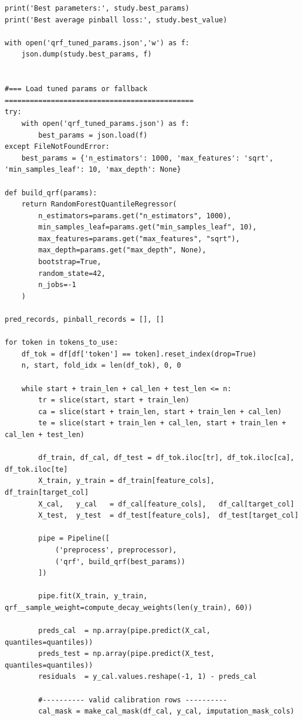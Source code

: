\documentclass[
  a4paper,
  DIV=11,
  numbers=noendperiod]{scrreprt}
\begin{document}
\begin{verbatim}
print('Best parameters:', study.best_params)
print('Best average pinball loss:', study.best_value)

with open('qrf_tuned_params.json','w') as f:
    json.dump(study.best_params, f)


#=== Load tuned params or fallback =============================================
try:
    with open('qrf_tuned_params.json') as f:
        best_params = json.load(f)
except FileNotFoundError:
    best_params = {'n_estimators': 1000, 'max_features': 'sqrt', 'min_samples_leaf': 10, 'max_depth': None}

def build_qrf(params):
    return RandomForestQuantileRegressor(
        n_estimators=params.get("n_estimators", 1000),
        min_samples_leaf=params.get("min_samples_leaf", 10),
        max_features=params.get("max_features", "sqrt"),
        max_depth=params.get("max_depth", None),
        bootstrap=True,
        random_state=42,
        n_jobs=-1
    )

pred_records, pinball_records = [], []

for token in tokens_to_use:
    df_tok = df[df['token'] == token].reset_index(drop=True)
    n, start, fold_idx = len(df_tok), 0, 0

    while start + train_len + cal_len + test_len <= n:
        tr = slice(start, start + train_len)
        ca = slice(start + train_len, start + train_len + cal_len)
        te = slice(start + train_len + cal_len, start + train_len + cal_len + test_len)

        df_train, df_cal, df_test = df_tok.iloc[tr], df_tok.iloc[ca], df_tok.iloc[te]
        X_train, y_train = df_train[feature_cols], df_train[target_col]
        X_cal,   y_cal   = df_cal[feature_cols],   df_cal[target_col]
        X_test,  y_test  = df_test[feature_cols],  df_test[target_col]

        pipe = Pipeline([
            ('preprocess', preprocessor),
            ('qrf', build_qrf(best_params))
        ])

        pipe.fit(X_train, y_train, qrf__sample_weight=compute_decay_weights(len(y_train), 60))

        preds_cal  = np.array(pipe.predict(X_cal,  quantiles=quantiles))
        preds_test = np.array(pipe.predict(X_test, quantiles=quantiles))
        residuals  = y_cal.values.reshape(-1, 1) - preds_cal

        #---------- valid calibration rows ----------
        cal_mask = make_cal_mask(df_cal, y_cal, imputation_mask_cols)


\end{verbatim}
\end{document}
